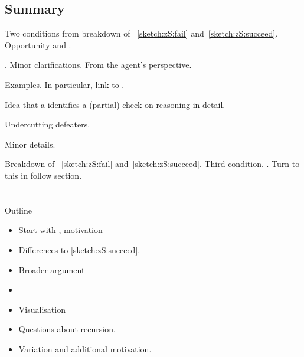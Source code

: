 \subsection{Summary}
\label{cha:zS:sec:requs:summary}

\begin{note}
  Two conditions from breakdown of ~\ref{sketch:zS:fail} and~\ref{sketch:zS:succeed}.
  Opportunity and \check{}.

  \requ{}.
  Minor clarifications.
  From the agent's perspective.

  Examples.
  In particular, link to .

  Idea that a \requ{} identifies a (partial) check on reasoning in detail.

  Undercutting defeaters.

  Minor details.
\end{note}

\begin{note}
  Breakdown of ~\ref{sketch:zS:fail} and~\ref{sketch:zS:succeed}.
  Third condition.
  .
  Turn to this in follow section.
\end{note}








\section{\zS{}}
\label{cha:zS:sec:question}

\begin{note}[Outline]
  Outline
  \begin{itemize}
  \item
    Start with \qzS{}, motivation
  \item
    Differences to \autoref{sketch:zS:succeed}.
  \item
    Broader argument
  \item
  \item
    Visualisation
  \item
    Questions about recursion.
  \item
    Variation and additional motivation.
  \end{itemize}
\end{note}

